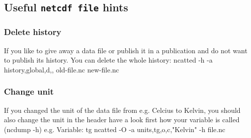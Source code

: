 \subsection{Useful \texttt{netcdf file} hints}

\subsubsection{Delete history}
If you like to give away a data file or publish it in a publication and do not want to publish its history. 
You can delete the whole history:
ncatted -h -a history,global,d,, old-file.nc new-file.nc

\subsubsection{Change unit}
If you changed the unit of the data file from e.g. Celcius to Kelvin, you should also change the unit in the header
have a look first how your variable is called  (ncdump -h) 
e.g. Variable: tg
ncatted -O -a units,tg,o,c,"Kelvin" -h file.nc

